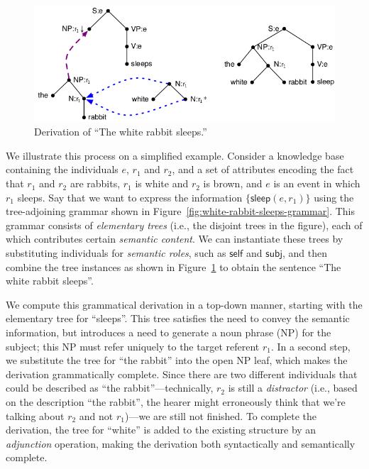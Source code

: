 \documentclass[letterpaper]{article}
\begin{document}
\begin{figure}[t]
  \centering
  \includegraphics[width=0.75\columnwidth]{pic-derivation-2}
  \caption{Derivation of ``The white rabbit sleeps.''}
  \label{fig:white-rabbit-sleeps-deriv}
\end{figure}


We illustrate this process on a simplified example.  Consider a
knowledge base containing the individuals $e$, $r_1$ and $r_2$, and a
set of attributes encoding the fact that $r_1$ and $r_2$ are rabbits,
$r_1$ is white and $r_2$ is brown, and $e$ is an event in which $r_1$
sleeps.  Say that we want to express the information
$\{\mathsf{sleep}(e,r_1)\}$ using the tree-adjoining grammar shown in
Figure~\ref{fig:white-rabbit-sleeps-grammar}. This grammar consists of
\emph{elementary trees} (i.e., the disjoint trees in the figure), each
of which contributes certain \emph{semantic content}. We can
instantiate these trees by substituting individuals for \emph{semantic
  roles}, such as $\mathsf{self}$ and $\mathsf{subj}$, and then
combine the tree instances as shown in
Figure~\ref{fig:white-rabbit-sleeps-deriv} to obtain the sentence
``The white rabbit sleeps''.

We compute this grammatical derivation in a top-down manner, starting with
the elementary tree for ``sleeps''. This tree satisfies the need to convey
the semantic information, but introduces a need to generate a noun phrase
(NP) for the subject; this NP must refer uniquely to the target referent
$r_1$. In a second step, we substitute the tree for ``the rabbit'' into the
open NP leaf, which makes the derivation grammatically complete. Since
there are two different individuals that could be described as ``the
rabbit''---technically, $r_2$ is still a \emph{distractor} (i.e., based on
the description ``the rabbit'', the hearer might erroneously think that
we're talking about $r_2$ and not $r_1$)---we are still not finished. To
complete the derivation, the tree for ``white'' is added to the existing
structure by an \emph{adjunction} operation, making the derivation
both syntactically and semantically complete.
\end{document}
